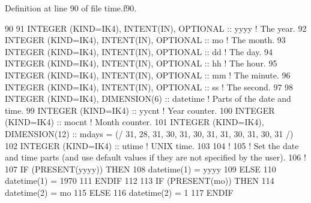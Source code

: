 Definition at line 90 of file time.\+f90.


\begin{DoxyCode}
90 
91 \textcolor{keywordtype}{INTEGER (KIND=IK4)}, \textcolor{keywordtype}{INTENT(IN)}, \textcolor{keywordtype}{OPTIONAL}    :: yyyy                     \textcolor{comment}{! The year.}
92 \textcolor{keywordtype}{INTEGER (KIND=IK4)}, \textcolor{keywordtype}{INTENT(IN)}, \textcolor{keywordtype}{OPTIONAL}    :: mo                       \textcolor{comment}{! The month.}
93 \textcolor{keywordtype}{INTEGER (KIND=IK4)}, \textcolor{keywordtype}{INTENT(IN)}, \textcolor{keywordtype}{OPTIONAL}    :: dd                       \textcolor{comment}{! The day.}
94 \textcolor{keywordtype}{INTEGER (KIND=IK4)}, \textcolor{keywordtype}{INTENT(IN)}, \textcolor{keywordtype}{OPTIONAL}    :: hh                       \textcolor{comment}{! The hour.}
95 \textcolor{keywordtype}{INTEGER (KIND=IK4)}, \textcolor{keywordtype}{INTENT(IN)}, \textcolor{keywordtype}{OPTIONAL}    :: mm                       \textcolor{comment}{! The minute.}
96 \textcolor{keywordtype}{INTEGER (KIND=IK4)}, \textcolor{keywordtype}{INTENT(IN)}, \textcolor{keywordtype}{OPTIONAL}    :: ss                       \textcolor{comment}{! The second.}
97 
98 \textcolor{keywordtype}{INTEGER (KIND=IK4)}, \textcolor{keywordtype}{DIMENSION(6)}            :: datetime                 \textcolor{comment}{! Parts of the date and time.}
99 \textcolor{keywordtype}{INTEGER (KIND=IK4)}                          :: yycnt                    \textcolor{comment}{! Year counter.}
100 \textcolor{keywordtype}{INTEGER (KIND=IK4)}                          :: mocnt                    \textcolor{comment}{! Month counter.}
101 \textcolor{keywordtype}{INTEGER (KIND=IK4)}, \textcolor{keywordtype}{DIMENSION(12)}           :: mdays = (/ 31, 28, 31, 30, 31, 30, 31, 31, 30, 31, 30, 31 /)
102 \textcolor{keywordtype}{INTEGER (KIND=IK4)}                          :: utime                    \textcolor{comment}{! UNIX time.}
103 
104 \textcolor{comment}{!}
105 \textcolor{comment}{! Set the date and time parts (and use default values if they are not specified by the user).}
106 \textcolor{comment}{!}
107 \textcolor{keywordflow}{IF} (\textcolor{keyword}{PRESENT}(yyyy)) \textcolor{keywordflow}{THEN}
108     datetime(1) = yyyy
109 \textcolor{keywordflow}{ELSE}
110     datetime(1) = 1970
111 \textcolor{keywordflow}{ENDIF}
112 
113 \textcolor{keywordflow}{IF} (\textcolor{keyword}{PRESENT}(mo)) \textcolor{keywordflow}{THEN}
114     datetime(2) = mo
115 \textcolor{keywordflow}{ELSE}
116     datetime(2) = 1
117 \textcolor{keywordflow}{ENDIF}

\end{DoxyCode}
